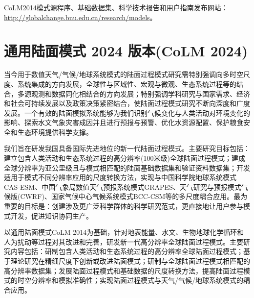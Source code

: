 CoLM2014模式源程序、基础数据集、科学技术报告和用户指南发布网站： \url{http://globalchange.bnu.edu.cn/research/models}。


\section[通用陆面模式 2024 版本({{CoLM}} 2024)]{通用陆面模式 2024 版本(CoLM 2024) }
当今用于数值天气/气候/地球系统模式的陆面过程模式研究需特别强调向多时空尺度、系统集成的方向发展，全球性与区域性、宏观与微观、生态系统过程等的结合，多源观测和数据同化相结合的方向发展；特别强调学科研究与国家需求、经济和社会可持续发展以及政策决策紧密结合，使陆面过程模式研究不断向深度和广度发展。一个有效的陆面模拟系统能够为我们识别气候变化与人类活动对环境变化的影响、探索水文气象灾害成因并且进行预报与预警、优化水资源配置、保护粮食安全和生态环境提供科学支撑。

我们旨在研发我国具备国际先进地位的新一代陆面过程模式。主要研究目标包括：建立包含人类活动和生态系统过程的高分辨率(100米级)全球陆面过程模式；建成全球分辨率为亚公里级且与模式相匹配的陆面基础数据集和验证资料数据集；开发适用于模式不同分辨率应用的尺度转换方法，实现与中国科学院地球系统模式CAS-ESM、中国气象局数值天气预报系统模式GRAPES、天气研究与预报模式气候版(CWRF)、国家气候中心气候系统模式BCC-CSM等的多尺度耦合应用。最为重要的目标是：创建涉及更广泛科学群体的科学研究范式，更直接地让用户参与模式开发，促进知识协同生产。

以通用陆面模式CoLM 2014为基础，针对地表能量、水文、生物地球化学循环和人为扰动等过程对其改进和完善，研发新一代高分辨率全球陆面过程模式。主要研究内容包括：研制包含人类活动和生态系统过程的高分辨率全球陆面过程模式；基于理论研究在精细尺度下创新或改进陆面模式；研制与全球陆面过程模式相匹配的高分辨率数据集；发展陆面过程模式和基础数据的尺度转换方法，提高陆面过程模式的时空分辨率和模拟准确性；实现陆面过程模式与天气/气候/地球系统模式的耦合应用。

